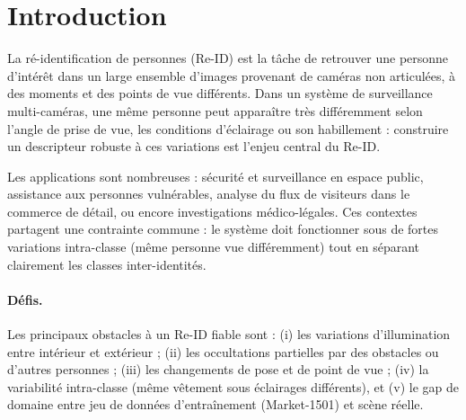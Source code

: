 \section{Introduction}
\label{sec:intro}

La ré-identification de personnes (Re-ID) est la t\^{a}che de retrouver une personne d'intérêt dans un large ensemble d'images provenant de caméras non articulées, à des moments et des points de vue différents. Dans un système de surveillance multi-caméras, une même personne peut apparaître très différemment selon l'angle de prise de vue, les conditions d'éclairage ou son habillement : construire un descripteur robuste à ces variations est l'enjeu central du Re-ID.

Les applications sont nombreuses : sécurité et surveillance en espace public, assistance aux personnes vulnérables, analyse du flux de visiteurs dans le commerce de détail, ou encore investigations médico-légales. Ces contextes partagent une contrainte commune : le système doit fonctionner sous de fortes variations intra-classe (même personne vue différemment) tout en séparant clairement les classes inter-identités.

\paragraph{Défis.}
Les principaux obstacles à un Re-ID fiable sont : (i) les variations d'illumination entre intérieur et extérieur ; (ii) les occultations partielles par des obstacles ou d'autres personnes ; (iii) les changements de pose et de point de vue ; (iv) la variabilité intra-classe (même vêtement sous éclairages différents), et (v) le gap de domaine entre jeu de données d'entraînement (Market-1501) et scène réelle.

